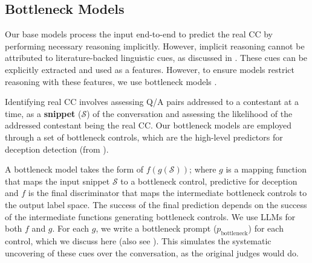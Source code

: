 

\subsection{Bottleneck Models}
Our base models process the input end-to-end to predict the real CC by performing necessary reasoning implicitly. However, implicit reasoning cannot be attributed to literature-backed linguistic cues, as discussed in . These cues can be explicitly extracted and used as a features. However, to ensure models restrict reasoning with these features, we use bottleneck models \cite{DBLP:conf/icml/KohNTMPKL20}. 

Identifying real CC involves assessing Q/A pairs addressed to a contestant at a time, as a \textbf{snippet} ($\mathcal{S}$) of the conversation and assessing the likelihood of the addressed contestant being the real CC. Our bottleneck models are employed through a set of bottleneck controls, which are the high-level predictors for deception detection (from ). 

A bottleneck model takes the form of $f(g(\mathcal{S}))$; where $g$ is a mapping function that maps the input snippet $\mathcal{S}$ to a bottleneck control, predictive for deception and $f$ is the final discriminator that maps the intermediate bottleneck controls to the output label space. The success of the final prediction depends on the success of the intermediate functions generating bottleneck controls. We use LLMs for both $f$ and $g$. For each $g$, we write a bottleneck prompt ($p_{\text{bottleneck}}$) for each control, which we discuss here (also see ). This simulates the systematic uncovering of these cues over the conversation, as the original judges would do.



